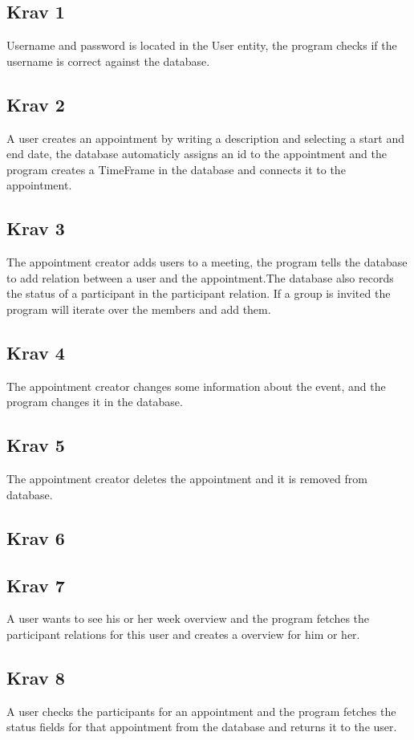 


\subsection{Krav 1}
Username and password is located in the User entity, the program checks if the username is correct against the database.

\subsection{Krav 2}
A user creates an appointment by writing a description and selecting a start and end date, the database automaticly assigns an id to the appointment and the program creates a TimeFrame in the database and connects it to the appointment.

\subsection{Krav 3}
The appointment creator adds users to a meeting, the program tells the database to add relation between a user and the appointment.The database also records the status of a participant in the participant relation. If a group is invited the program will iterate over the members and add them.

\subsection{Krav 4}
The appointment creator changes some information about the event, and the program changes it in the database.

\subsection{Krav 5}
The appointment creator deletes the appointment and it is removed from database.

\subsection{Krav 6}


\subsection{Krav 7}
A user wants to see his or her week overview and the program fetches the participant relations for this user and creates a overview for him or her. 

\subsection{Krav 8}
A user checks the participants for an appointment and the program fetches the status fields for that appointment from the database and returns it to the user.

